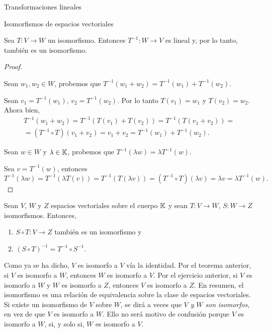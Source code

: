 \begin{chapter}{Transformaciones lineales}
\begin{section}{Isomorfismos de espacios vectoriales}
        \begin{teorema}
            Sea $T:V \to W$ un isomorfismo. Entonces $T^{-1}: W \to V$ es lineal y, por lo tanto, también es un isomorfismo.
        \end{teorema}
        \begin{proof}
            \
            
            Sean $w_1, w_2 \in W$, probemos que $ T^{-1}(w_1+w_2) =  T^{-1}(w_1)+ T^{-1}(w_2)$. 
            
            Sean $v_1 = T^{-1}(w_1) $, $v_2 = T^{-1}(w_2)$. Por lo tanto $T(v_1) = w_1$ y $T(v_2) = w_2$. Ahora bien,
            \begin{multline*}
                T^{-1}(w_1+w_2) = 	T^{-1}(T(v_1)+T(v_2))  = 	T^{-1}(T(v_1+v_2)) = \\ =(T^{-1}\circ T)(v_1+v_2) = v_1+v_2 = T^{-1}(w_1)+ T^{-1}(w_2). 
            \end{multline*}    
            
            
            Sean $w \in W$ y $\lambda  \in \mathbb K$, probemos que $T^{-1}(\lambda w) =\lambda  T^{-1}(w)$. 
            
            Sea $v = T^{-1}(w)$, entonces
            \begin{equation*}
            T^{-1}(\lambda w) = 	T^{-1}(\lambda T(v))  = 	T^{-1}(T(\lambda v)) = (T^{-1}\circ T)(\lambda v) = \lambda v = \lambda  T^{-1}(w). 
            \end{equation*}
                \end{proof}
        
        



        \begin{ejercicio*} 
            Sean $V$, $W$ y $Z$ espacios vectoriales sobre el cuerpo $\mathbb K$ y sean $T:V \to W$, $S:W \to Z$ isomorfismos. Entonces, 
            \begin{enumerate}
                \item $S\circ T:V \to Z$  también es un isomorfismo y
                \item 	$(S\circ T)^{-1} = T^{-1}\circ S^{-1}$.
            \end{enumerate}
        \end{ejercicio*}
        
        


        Como ya se ha dicho, $V$ es isomorfo a $V$ vía la identidad. Por  el teorema anterior, si $V$ es isomorfo a $W$,  entonces $W$ es isomorfo a $V$. Por  el ejercicio anterior, si $V$ es isomorfo a $W$ y $W$ es isomorfo a $Z$, entonces $V$ es isomorfo a $Z$. En resumen, el isomorfismo es una relación de equivalencia sobre la clase de espacios vectoriales. Si existe un isomorfismo de $V$ sobre $W$, se dirá a veces que \textit{$V$ y $W$ son isomorfos}, en vez de que $V$ es isomorfo a $W$. Ello no será motivo de confusión porque $V$ es isomorfo a $W$, si, y solo si, $W$ es isomorfo a $V$.	
            

\end{section}
\end{chapter}
